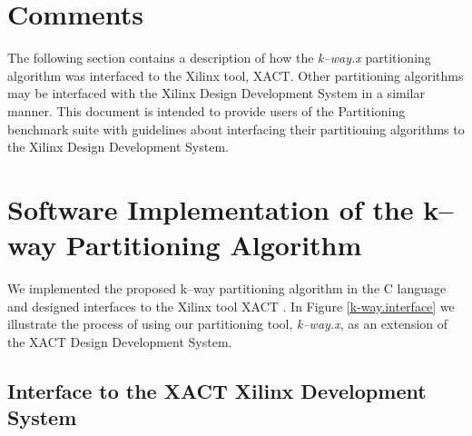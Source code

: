 
\textheight 9.0in
\textwidth 6.5in
\oddsidemargin 0.0in
\topmargin -0.5in
\setlength{\floatsep}{0.3cm}
\setlength{\textfloatsep}{0.3cm}
\setlength{\intextsep}{0.3cm}
\newcommand{\definedas} {\stackrel{\Delta} {=}}










\section{Comments}
The following section contains a description of how the
{\em k--way.x} \cite{Kuznar93a} partitioning algorithm was interfaced to
the Xilinx tool, XACT. Other partitioning algorithms may be interfaced with
the Xilinx Design Development System in a similar manner. This document is
intended to provide users of the Partitioning benchmark suite with guidelines
about interfacing their partitioning algorithms to the Xilinx Design
Development System. 

\section{Software Implementation of the k--way Partitioning Algorithm}

We implemented the proposed k--way partitioning algorithm in the C 
language and designed interfaces to the Xilinx tool XACT \cite{Xil91a}.
In Figure \ref{k-way.interface} we illustrate the process of using our 
partitioning tool, {\sl k--way.x}, as an extension of the XACT Design 
Development System.

\subsection{Interface to the XACT Xilinx Development System}



